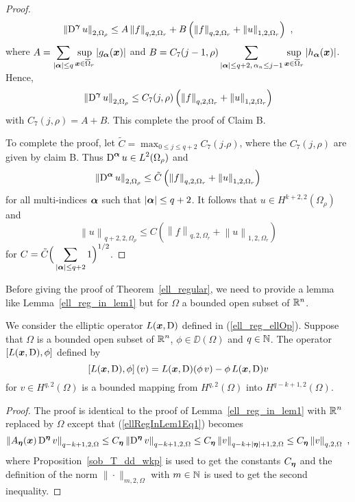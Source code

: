\begin{proof}
\[
\left\| \operatorname{D}^{{\bm{\gamma}}} u \right\|_{2,\Omega_\rho}
\leq A \left\| f \right\|_{q,2,\Omega_r} +
B \left( \left\|f\right\|_{q,2,\Omega_r} +
\left\|u\right\|_{1,2,\Omega_r} \right) \ ,
\]
where
$\displaystyle A = \sum_{|{\bm{\alpha}}|\leq q}
\sup_{{\bm{x}}\in \overline{\Omega}_r} \left| g_{{\bm{\alpha}}}({\bm{x}}) \right|$
and
$\displaystyle B = C_7(j-1,\rho) \sum_{|{\bm{\alpha}}|\leq q+2,\, \alpha_n\leq j-1}
\sup_{{\bm{x}}\in \overline{\Omega}_r} \left| h_{{\bm{\alpha}}}({\bm{x}}) \right|$.
Hence,
\[
\left\|\operatorname{D}^{{\bm{\gamma}}} u \right\|_{2,\Omega_\rho} \leq C_7(j,\rho) \left(
\left\|f\right\|_{q,2,\Omega_r} + \left\|u\right\|_{1,2,\Omega_r}
\right)
\]
with $C_7(j,\rho) = A+B$.  This complete the proof of Claim B.

 To complete the proof, let
$\displaystyle \tilde{C} = \max_{0\leq j \leq q+2} C_7(j.\rho)$, where the
$C_7(j,\rho)$ are given by claim B.  Thus
$\displaystyle \operatorname{D}^{{\bm{\alpha}}} u \in L^2(\Omega_\rho)$ and
\[
\left\|\operatorname{D}^{{\bm{\alpha}}} u \right\|_{2,\Omega_\rho} \leq \tilde{C} \left(
\left\|f\right\|_{q,2,\Omega_r} + \left\|u\right\|_{1,2,\Omega_r}
\right)
\]
for all multi-indices ${\bm{\alpha}}$ such that
$|{\bm{\alpha}}|\leq q+2$.  It follows
that $u \in H^{k+2,2}(\Omega_\rho)$ and
\[
\left\|u \right\|_{q+2,2,\Omega_\rho} \leq C \left(
\left\|f\right\|_{q,2,\Omega_r} + \left\|u\right\|_{1,2,\Omega_r}
\right)
\]
for $\displaystyle C = \tilde{C}
\Big(\sum_{|{\bm{\alpha}}|\leq q+2} 1\Big)^{1/2}$.
\end{proof}

Before giving the proof of Theorem~\ref{ell_regular}, we
need to provide a lemma like Lemma~\ref{ell_reg_in_lem1} but for
$\Omega$ a bounded open subset of $\mathbb{R}^n$.

\begin{lemma} \label{ell_reg_out_lem1}
We consider the elliptic operator $L({\bm{x}},\operatorname{D})$ defined in
(\ref{ell_reg_ellOp}).  Suppose that $\Omega$ is a bounded open subset
of $\displaystyle \mathbb{R}^n$, $\phi \in \DD(\Omega)$ and $q\in \mathbb{N}$.
The operator $\left[ L({\bm{x}},\operatorname{D}), \phi\right]$ defined by
\[
\left[ L({\bm{x}},\operatorname{D}), \phi\right](v)
= L({\bm{x}},\operatorname{D}) (\phi\, v) - \phi\, L({\bm{x}},\operatorname{D}) v
\]
for $\displaystyle v \in \displaystyle H^{q,2}(\Omega)$ is a bounded
mapping from $\displaystyle H^{q,2}(\Omega)$ into
$\displaystyle H^{q-k+1,2}(\Omega)$.
\end{lemma}

\begin{proof}
The proof is identical to the proof of Lemma~\ref{ell_reg_in_lem1}
with $\displaystyle \mathbb{R}^n$ replaced by $\Omega$ except that
(\ref{ellRegInLem1Eq1}) becomes
\[
\left\| A_{{\bm{\eta}}}({\bm{x}}) \operatorname{D}^{{\bm{\eta}}} v \right\|_{q-k+1,2,\Omega}
\leq C_{{\bm{\eta}}} \left\| \operatorname{D}^{{\bm{\eta}}} v \right\|_{q-k+1,2,\Omega}
\leq C_{{\bm{\eta}}} \left\| v \right\|_{q-k+|{\bm{\eta}}|+1,2,\Omega}
\leq C_{{\bm{\eta}}} \left\| v \right\|_{q,2,\Omega} \ ,
\]
where Proposition~\ref{sob_T_dd_wkp} is used to get the constants
$C_{{\bm{\eta}}}$ and the definition of the norm $\|\cdot\|_{m,2,\Omega}$
with $m\in \mathbb{N}$ is used to get the second inequality.
\end{proof}

